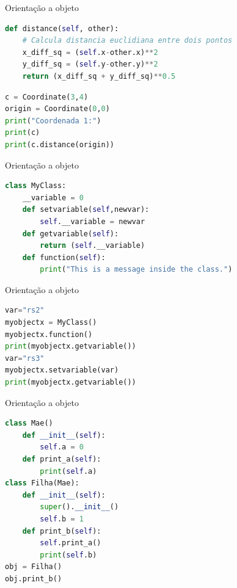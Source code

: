 \documentclass[aspectratio=169]{beamer} %
\begin{document}
\begin{SliTC}{Orientação a objeto}

\begin{lstlisting}[language=python]
def distance(self, other):
    # Calcula distancia euclidiana entre dois pontos
    x_diff_sq = (self.x-other.x)**2
    y_diff_sq = (self.y-other.y)**2
    return (x_diff_sq + y_diff_sq)**0.5
\end{lstlisting}

\begin{lstlisting}[language=python]
c = Coordinate(3,4)
origin = Coordinate(0,0)
print("Coordenada 1:")
print(c)
print(c.distance(origin))
\end{lstlisting}
\end{SliTC}

\begin{SliTC}{Orientação a objeto}

\begin{lstlisting}[language=python]
class MyClass:
    __variable = 0
    def setvariable(self,newvar):
        self.__variable = newvar
    def getvariable(self):
        return (self.__variable)
    def function(self):
        print("This is a message inside the class.")
\end{lstlisting}
\end{SliTC} 



\begin{SliTC}{Orientação a objeto}

\begin{lstlisting}[language=python]
var="rs2"
myobjectx = MyClass()
myobjectx.function()
print(myobjectx.getvariable())
var="rs3"
myobjectx.setvariable(var)
print(myobjectx.getvariable())
\end{lstlisting}
\end{SliTC}

\begin{SliTC}{Orientação a objeto}
\begin{itemize}
\end{itemize}

\begin{lstlisting}[language=python]
class Mae()
    def __init__(self):
        self.a = 0
    def print_a(self):
        print(self.a)
class Filha(Mae):
    def __init__(self):
        super().__init__()
        self.b = 1
    def print_b(self):
        self.print_a()
        print(self.b)
obj = Filha()
obj.print_b()
        
        
\end{lstlisting}


\end{SliTC}
\end{document}
